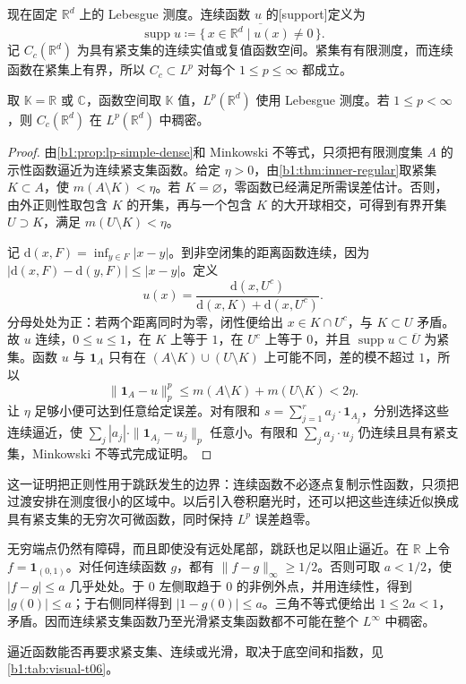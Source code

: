 现在固定 \(\mathbb R^d\) 上的 Lebesgue 测度。连续函数 \(u\) 的[support]定义为
\[
 \operatorname{supp}u\coloneqq\overline{\{\,x\in\mathbb R^d\mid u(x)\ne0\,\}}.
\]
记 \(C_c(\mathbb R^d)\) 为具有紧支集的连续实值或复值函数空间。紧集有有限测度，而连续函数在紧集上有界，所以 \(C_c\subset L^p\) 对每个 \(1\leq p\leq\infty\) 都成立。

\begin{proposition}\label{b1:prop:lp-continuous-dense}
取 \(\mathbb K=\mathbb R\) 或 \(\mathbb C\)，函数空间取 \(\mathbb K\) 值，\(L^p(\mathbb R^d)\) 使用 Lebesgue 测度。若 \(1\leq p<\infty\)，则 \(C_c(\mathbb R^d)\) 在 \(L^p(\mathbb R^d)\) 中稠密。
\end{proposition}
\begin{proof}
由\cref{b1:prop:lp-simple-dense}和 Minkowski 不等式，只须把有限测度集 \(A\) 的示性函数逼近为连续紧支集函数。给定 \(\eta>0\)，由\cref{b1:thm:inner-regular}取紧集 \(K\subset A\)，使 \(m(A\setminus K)<\eta\)。若 \(K=\varnothing\)，零函数已经满足所需误差估计。否则，由外正则性取包含 \(K\) 的开集，再与一个包含 \(K\) 的大开球相交，可得到有界开集 \(U\supset K\)，满足 \(m(U\setminus K)<\eta\)。

记 \(\mathrm{d}(x,F)=\inf_{y\in F}|x-y|\)。到非空闭集的距离函数连续，因为 \(|\mathrm{d}(x,F)-\mathrm{d}(y,F)|\leq|x-y|\)。定义
\[
 u(x)=\frac{\mathrm{d}(x,U^c)}{\mathrm{d}(x,K)+\mathrm{d}(x,U^c)}.
\]
分母处处为正：若两个距离同时为零，闭性便给出 \(x\in K\cap U^c\)，与 \(K\subset U\) 矛盾。故 \(u\) 连续，\(0\leq u\leq1\)，在 \(K\) 上等于 \(1\)，在 \(U^c\) 上等于 \(0\)，并且 \(\operatorname{supp}u\subset\overline U\) 为紧集。函数 \(u\) 与 \(\mathbf1_A\) 只有在 \((A\setminus K)\cup(U\setminus K)\) 上可能不同，差的模不超过 \(1\)，所以
\[
 \|\mathbf1_A-u\|_p^p
 \leq m(A\setminus K)+m(U\setminus K)<2\eta.
\]
让 \(\eta\) 足够小便可达到任意给定误差。对有限和 \(s=\sum_{j=1}^ra_j\cdot\mathbf1_{A_j}\)，分别选择这些连续逼近，使 \(\sum_j|a_j|\cdot\|\mathbf1_{A_j}-u_j\|_p\) 任意小。有限和 \(\sum_ja_j\cdot u_j\) 仍连续且具有紧支集，Minkowski 不等式完成证明。
\end{proof}

这一证明把正则性用于跳跃发生的边界：连续函数不必逐点复制示性函数，只须把过渡安排在测度很小的区域中。以后引入卷积磨光时，还可以把这些连续近似换成具有紧支集的无穷次可微函数，同时保持 \(L^p\) 误差趋零。

\ProseParagraphBreak

无穷端点仍然有障碍，而且即使没有远处尾部，跳跃也足以阻止逼近。在 \(\mathbb R\) 上令 \(f=\mathbf1_{(0,1)}\)。对任何连续函数 \(g\)，都有 \(\|f-g\|_\infty\geq1/2\)。否则可取 \(a<1/2\)，使 \(|f-g|\leq a\) 几乎处处。于 \(0\) 左侧取趋于 \(0\) 的非例外点，并用连续性，得到 \(|g(0)|\leq a\)；于右侧同样得到 \(|1-g(0)|\leq a\)。三角不等式便给出 \(1\leq2a<1\)，矛盾。因而连续紧支集函数乃至光滑紧支集函数都不可能在整个 \(L^\infty\) 中稠密。

逼近函数能否再要求紧支集、连续或光滑，取决于底空间和指数，见\cref{b1:tab:visual-t06}。

